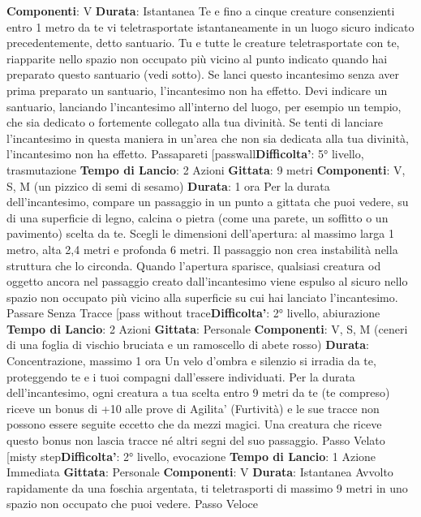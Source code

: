 \begin{multicols}{2}
\textbf{Componenti}: V
\textbf{Durata}: Istantanea
Te e fino a cinque creature consenzienti entro 1 metro
da te vi teletrasportate istantaneamente in un luogo
sicuro indicato precedentemente, detto santuario. Tu e
tutte le creature teletrasportate con te, riapparite nello
spazio non occupato più vicino al punto indicato quando
hai preparato questo santuario (vedi sotto). Se lanci
questo incantesimo senza aver prima preparato un
santuario, l’incantesimo non ha effetto.
Devi indicare un santuario, lanciando l’incantesimo
all’interno del luogo, per esempio un tempio, che sia
dedicato o fortemente collegato alla tua divinità. Se tenti
di lanciare l’incantesimo in questa maniera in un’area
che non sia dedicata alla tua divinità, l’incantesimo non
ha effetto.
Passapareti
[passwall\textbf{Difficolta'}:
5° livello, trasmutazione
\textbf{Tempo di Lancio}: 2 Azioni
\textbf{Gittata}: 9 metri
\textbf{Componenti}: V, S, M (un pizzico di semi di sesamo)
\textbf{Durata}: 1 ora
Per la durata dell’incantesimo, compare un passaggio
in un punto a gittata che puoi vedere, su di una
superficie di legno, calcina o pietra (come una parete,
un soffitto o un pavimento) scelta da te. Scegli le
dimensioni dell’apertura: al massimo larga 1 metro, 
alta 2,4 metri e profonda 6 metri. Il passaggio non crea
instabilità nella struttura che lo circonda.
Quando l’apertura sparisce, qualsiasi creatura od
oggetto ancora nel passaggio creato dall’incantesimo
viene espulso al sicuro nello spazio non occupato più
vicino alla superficie su cui hai lanciato l’incantesimo.
Passare Senza Tracce
[pass without trace\textbf{Difficolta'}:
2° livello, abiurazione
\textbf{Tempo di Lancio}: 2 Azioni
\textbf{Gittata}: Personale
\textbf{Componenti}: V, S, M (ceneri di una foglia di vischio
bruciata e un ramoscello di abete rosso)
\textbf{Durata}: Concentrazione, massimo 1 ora
Un velo d’ombra e silenzio si irradia da te, proteggendo
te e i tuoi compagni dall’essere individuati. Per la durata
dell’incantesimo, ogni creatura a tua scelta entro 9 metri
da te (te compreso) riceve un bonus di +10 alle prove di
Agilita' (Furtività) e le sue tracce non possono
essere seguite eccetto che da mezzi magici. Una
creatura che riceve questo bonus non lascia tracce né
altri segni del suo passaggio.
Passo Velato
[misty step\textbf{Difficolta'}:
2° livello, evocazione
\textbf{Tempo di Lancio}: 1 Azione Immediata
\textbf{Gittata}: Personale
\textbf{Componenti}: V
\textbf{Durata}: Istantanea
Avvolto rapidamente da una foschia argentata, ti
teletrasporti di massimo 9 metri in uno spazio non
occupato che puoi vedere.
Passo Veloce

\end{multicols}
